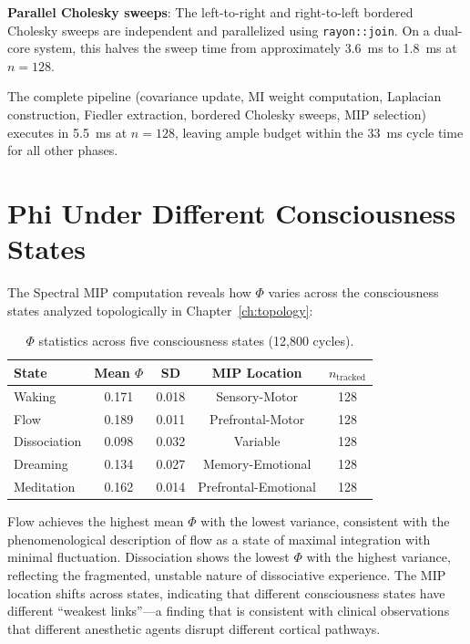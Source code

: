 \documentclass[12pt]{book}
\begin{document}
\textbf{Parallel Cholesky sweeps}: The left-to-right and right-to-left bordered Cholesky sweeps are independent and parallelized using \texttt{rayon::join}. On a dual-core system, this halves the sweep time from approximately 3.6~ms to 1.8~ms at $n = 128$.

The complete pipeline (covariance update, MI weight computation, Laplacian construction, Fiedler extraction, bordered Cholesky sweeps, MIP selection) executes in 5.5~ms at $n = 128$, leaving ample budget within the 33~ms cycle time for all other phases.

\section{Phi Under Different Consciousness States}

The Spectral MIP computation reveals how $\Phi$ varies across the consciousness states analyzed topologically in Chapter~\ref{ch:topology}:

\begin{table}[H]
\centering
\caption{$\Phi$ statistics across five consciousness states (12,800 cycles).}
\label{tab:phi-by-state}
\begin{tabular}{lcccc}
\toprule
\textbf{State} & \textbf{Mean $\Phi$} & \textbf{SD} & \textbf{MIP Location} & \textbf{$n_{\text{tracked}}$} \\
\midrule
Waking & 0.171 & 0.018 & Sensory-Motor & 128 \\
Flow & 0.189 & 0.011 & Prefrontal-Motor & 128 \\
Dissociation & 0.098 & 0.032 & Variable & 128 \\
Dreaming & 0.134 & 0.027 & Memory-Emotional & 128 \\
Meditation & 0.162 & 0.014 & Prefrontal-Emotional & 128 \\
\bottomrule
\end{tabular}
\end{table}

Flow achieves the highest mean $\Phi$ with the lowest variance, consistent with the phenomenological description of flow as a state of maximal integration with minimal fluctuation. Dissociation shows the lowest $\Phi$ with the highest variance, reflecting the fragmented, unstable nature of dissociative experience. The MIP location shifts across states, indicating that different consciousness states have different ``weakest links''---a finding that is consistent with clinical observations that different anesthetic agents disrupt different cortical pathways.
\end{document}
